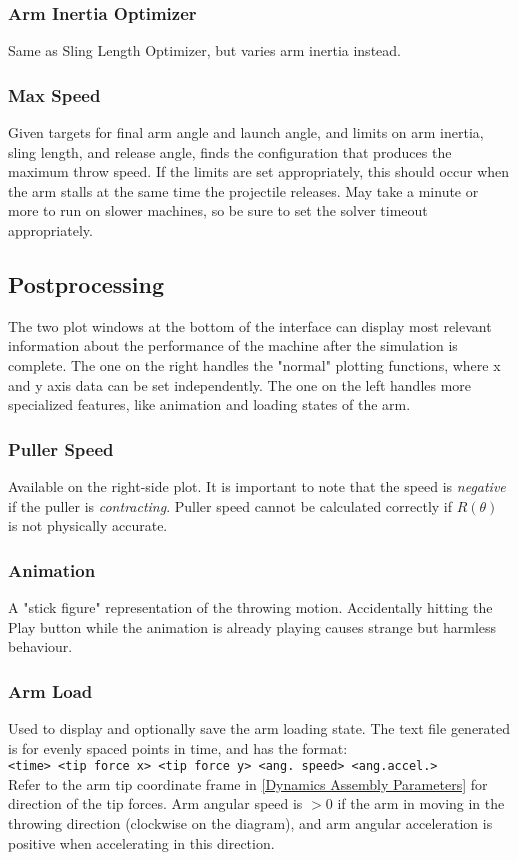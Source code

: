 \documentclass{article}
\begin{document}
\subsubsection{Arm Inertia Optimizer}
Same as Sling Length Optimizer, but varies arm inertia instead.
\subsubsection{Max Speed}
Given targets for final arm angle and launch angle, and limits on arm inertia, sling length, and release angle, finds the configuration that produces the maximum throw speed. If the limits are set appropriately, this should occur when the arm stalls at the same time the projectile releases. May take a minute or more to run on slower machines, so be sure to set the solver timeout appropriately.

\subsection{Postprocessing}
The two plot windows at the bottom of the interface can display most relevant information about the performance of the machine after the simulation is complete. The one on the right handles the "normal" plotting functions, where x and y axis data can be set independently. The one on the left handles more specialized features, like animation and loading states of the arm.
\subsubsection{Puller Speed} Available on the right-side plot. It is important to note that the speed is \emph{negative} if the puller is \emph{contracting}. Puller speed cannot be calculated correctly if $R(\theta)$ is not physically accurate.
\subsubsection{Animation} A "stick figure" representation of the throwing motion. Accidentally hitting the Play button while the animation is already playing causes strange but harmless behaviour.
\subsubsection{Arm Load} Used to display and optionally save the arm loading state. The text file generated is for evenly spaced points in time, and has the format:\\ \verb|<time> <tip force x> <tip force y> <ang. speed> <ang.accel.>|\\
Refer to the arm tip coordinate frame in \ref{Dynamics Assembly Parameters} for direction of the tip forces. Arm angular speed is $>0$ if the arm in moving in the throwing direction (clockwise on the diagram), and arm angular acceleration is positive when accelerating in this direction.
\end{document}

